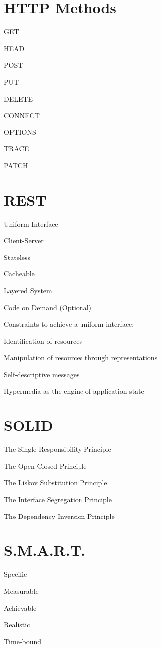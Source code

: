 \documentclass [8pt] {extarticle}
\begin{document}
    \section {HTTP Methods}

    GET

    HEAD

    POST

    PUT

    DELETE

    CONNECT

    OPTIONS

    TRACE

    PATCH

    \section {REST}

    Uniform Interface

    Client-Server

    Stateless

    Cacheable

    Layered System

    Code on Demand (Optional)

    \smallskip

    Constraints to achieve a uniform interface:

    Identification of resources

    Manipulation of resources through representations

    Self-descriptive messages

    Hypermedia as the engine of application state

    \section {SOLID}

    The Single Responsibility Principle

    The Open-Closed Principle

    The Liskov Substitution Principle

    The Interface Segregation Principle

    The Dependency Inversion Principle

    \section {S.M.A.R.T.}

    Specific

    Measurable

    Achievable

    Realistic

    Time-bound
\end{document}
